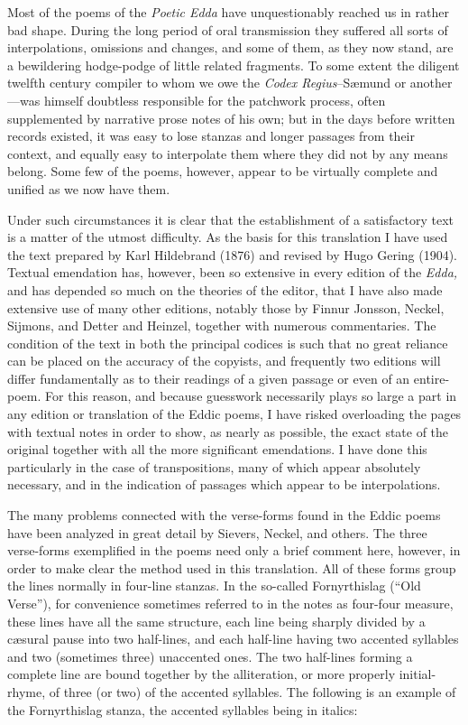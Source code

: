 \documentclass{scrbook}
\newcommand{\mdash}{---}
\newcommand{\ndash}{--}
\begin{document}

Most of the poems of the \emph{Poetic Edda} have unquestionably reached us in rather bad shape. During the long period of oral transmission they suffered all sorts of interpolations, omissions and changes, and some of them, as they now stand, are a bewildering hodge-podge of little related fragments. To some extent the diligent twelfth century compiler to whom we owe the \emph{Codex Regius}{\ndash}Sæmund or another{\mdash}was himself doubtless responsible for the patchwork process, often supplemented by narrative prose notes of his own; but in the days before written records existed, it was easy to lose stanzas and longer passages from their context, and equally easy to interpolate them where they did not by any means belong. Some few of the poems, however, appear to be virtually complete and unified as we now have them.

Under such circumstances it is clear that the establishment of a satisfactory text is a matter of the utmost difficulty. As the basis for this translation I have used the text prepared by Karl Hildebrand (1876) and revised by Hugo Gering (1904). Textual emendation has, however, been so extensive in every edition of the \emph{Edda,} and has depended so much on the theories of the editor, that I have also made extensive use of many other editions, notably those by Finnur Jonsson, Neckel, Sijmons, and Detter and Heinzel, together with numerous commentaries. The condition of the text in both the principal codices is such that no great reliance can be placed on the accuracy of the copyists, and frequently two editions will differ fundamentally as to their readings of a given passage or even of an entire-poem. For this reason, and because guesswork necessarily plays so large a part in any edition or translation of the Eddic poems, I have risked overloading the pages with textual notes in order to show, as nearly as possible, the exact state of the original together with all the more significant emendations. I have done this particularly in the case of transpositions, many of which appear absolutely necessary, and in the indication of passages which appear to be interpolations.


The many problems connected with the verse-forms found in the Eddic poems have been analyzed in great detail by Sievers, Neckel, and others. The three verse-forms exemplified in the poems need only a brief comment here, however, in order to make clear the method used in this translation. All of these forms group the lines normally in four-line stanzas. In the so-called Fornyrthislag (``Old Verse''), for convenience sometimes referred to in the notes as four-four measure, these lines have all the same structure, each line being sharply divided by a cæsural pause into two half-lines, and each half-line having two accented syllables and two (sometimes three) unaccented ones. The two half-lines forming a complete line are bound together by the alliteration, or more properly initial-rhyme, of three (or two) of the accented syllables. The following is an example of the Fornyrthislag stanza, the accented syllables being in italics:
\end{document}
